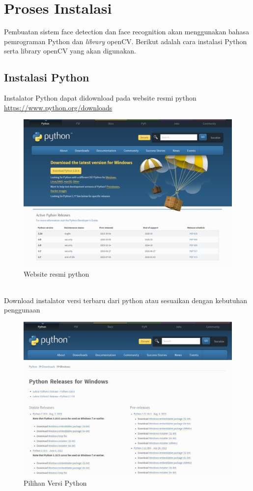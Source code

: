 \section{Proses Instalasi}
Pembuatan sistem face detection dan face recognition akan menggunakan bahasa pemrograman Python dan \emph{library} openCV. 
Berikut adalah cara instalasi Python serta library openCV yang akan digunakan.

\subsection{Instalasi Python}
Instalator Python dapat didownload pada website resmi python \url{https://www.python.org/downloads}
\begin{figure}[h!]
    \centering
    \includegraphics[width=0.9\linewidth]{images/web_py.PNG}
    \caption{Website resmi python}
\end{figure}
\\Download instalator versi terbaru dari python atau sesuaikan dengan kebutuhan penggunaan
\begin{figure}[h!]
    \centering
    \includegraphics[width=0.9\linewidth]{images/py_ver.PNG}
    \caption{Pilihan Versi Python}
\end{figure}
